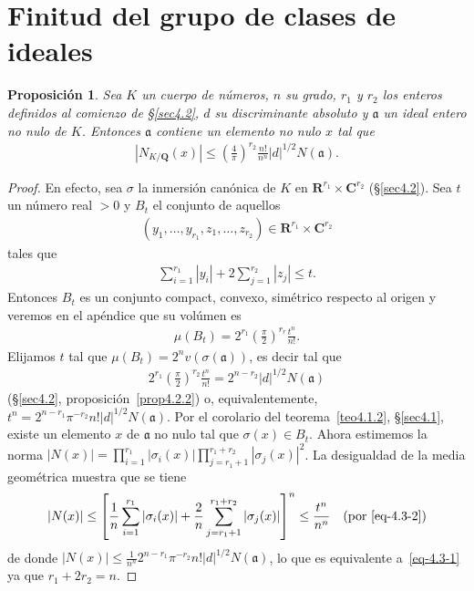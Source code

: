 \documentclass[10pt,oneside,bibtotoc,smallheadings,leqno,a5paper,DIV=12]{scrbook}
\newcommand{\RR}{\mathbf{R}}
\newcommand{\QQ}{\mathbf{Q}}
\newcommand{\CC}{\mathbf{C}}
\newcommand{\idl}[1]{\mathfrak{#1}}
\newcommand{\QED}{}%
\newcommand{\abs}[1]{\left\lvert#1\right\rvert}
\numberwithin{equation}{section}
\theoremstyle{defi}
\theoremstyle{enonce}
\newtheorem{proposition}{Proposici\'on}
\theoremstyle{rem}
\numberwithin{theorem}{section}
\numberwithin{proposition}{section}
\numberwithin{definition}{section}
\numberwithin{lemma}{section}
\numberwithin{corollary}{section}
\numberwithin{example}{section}
\numberwithin{footnote}{section}%
\begin{document}
\section{Finitud del grupo de clases de ideales}\label{sec4.3}

\begin{proposition}\label{prop4.3.1}
Sea $K$ un cuerpo de n\'umeros, $n$ su grado, $r_{1}$ y $r_{2}$ los enteros definidos al comienzo de
\S\ref{sec4.2}, $d$ su discriminante absoluto y $\idl{a}$ un ideal entero no nulo de $K$. Entonces $\idl{a}$
contiene un elemento no nulo $x$ tal que
\begin{gather}\label{eq-4.3-1}
\abs{N_{K/\QQ}(x)}\leq\left(\frac{4}{\pi}\right)^{r_{2}}\frac{n!}{n^{n}}\abs{d}^{1/2}N(\idl{a}).
\end{gather}
\end{proposition}

\begin{proof}
En efecto, sea $\sigma$ la inmersi\'on can\'onica de $K$ en $\RR^{r_{1}}\times\CC^{r_{2}}$ (\S\ref{sec4.2}).
Sea $t$ un n\'umero real $>0$ y $B_{t}$ el conjunto de aquellos
\begin{gather*}
(y_{1},\dots,y_{r_{1}},z_{1},\dots,z_{r_{2}})\in\RR^{r_{1}}\times\CC^{r_{2}}
\end{gather*}
tales que
\begin{gather}\label{eq-4.3-2}
\sum_{i=1}^{r_{1}}\abs{y_{i}}+2\sum_{j=1}^{r_{2}}\abs{z_{j}}\leq t.
\end{gather}
Entonces $B_{t}$ es un conjunto compact, convexo, sim\'etrico respecto al origen y veremos en el ap\'endice
que su vol\'umen es
\begin{gather}
\mu(B_{t}) = 2^{r_{1}}\left(\frac{\pi}{2}\right)^{r_{r}}\frac{t^{n}}{n!}.
\end{gather}
Elijamos $t$ tal que $\mu(B_{t}) = 2^{n}v(\sigma(\idl{a}))$, es decir tal que
\begin{gather*}
2^{r_{1}}\left(\frac{\pi}{2}\right)^{r_{2}}\frac{t^{n}}{n!} = 2^{n-r_{2}}\abs{d}^{1/2}N(\idl{a})
\end{gather*}
(\S\ref{sec4.2}, proposici\'on~\ref{prop4.2.2}) o, equivalentemente, $t^{n} = 2^{n-r_{1}}\pi^{-r_{2}}n!\abs{d}^{1/2}N(\idl{a})$.
Por el corolario del teorema~\ref{teo4.1.2}, \S\ref{sec4.1},
existe un elemento $x$ de $\idl{a}$ no nulo tal que $\sigma(x)\in B_{t}$. 
Ahora estimemos la norma $\abs{N(x)} = \prod_{i=1}^{r_{1}}\abs{\sigma_{i}(x)}\prod_{j=r_{1}+1}^{r_{1}+r_{2}}\abs{\sigma_{j}(x)}^{2}$.
La desigualdad de la media geom\'etrica muestra que se tiene
\begin{gather*}
\abs{N(x)}\leq\left[\frac{1}{n}\sum_{i=1}^{r_{1}}\abs{\sigma_{i}(x)}+\frac{2}{n}\sum_{j=r_{1}+1}^{r_{1}+r_{2}}
\abs{\sigma_{j}(x)}\right]^{n}\leq\frac{t^{n}}{n^{n}}\quad(\text{por~\eqref{eq-4.3-2}})
\end{gather*}
de donde $\abs{N(x)}\leq\frac{1}{n^{n}}2^{n-r_{1}}\pi^{-r_{2}}n!\abs{d}^{1/2}N(\idl{a})$, lo que es equivalente
a~\eqref{eq-4.3-1} ya que $r_{1}+2r_{2} = n$. \QED
\end{proof}
\end{document}
